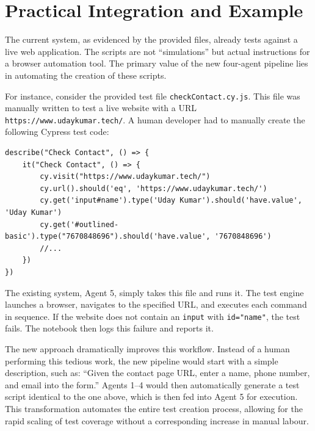 \documentclass{article}
\begin{document}
\section{Practical Integration and Example}
The current system, as evidenced by the provided files, already tests against a live web application. The scripts are not ``simulations'' but actual instructions for a browser automation tool. The primary value of the new four-agent pipeline lies in automating the creation of these scripts.

For instance, consider the provided test file \texttt{checkContact.cy.js}. This file was manually written to test a live website with a URL \texttt{https://www.udaykumar.tech/}. A human developer had to manually create the following Cypress test code:

\begin{verbatim}
describe("Check Contact", () => {
    it("Check Contact", () => {
        cy.visit("https://www.udaykumar.tech/")
        cy.url().should('eq', 'https://www.udaykumar.tech/')
        cy.get('input#name').type('Uday Kumar').should('have.value', 'Uday Kumar')
        cy.get('#outlined-basic').type("7670848696").should('have.value', '7670848696')
        //...
    })
})
\end{verbatim}

The existing system, Agent 5, simply takes this file and runs it. The test engine launches a browser, navigates to the specified URL, and executes each command in sequence. If the website does not contain an \texttt{input} with \texttt{id="name"}, the test fails. The notebook then logs this failure and reports it.

The new approach dramatically improves this workflow. Instead of a human performing this tedious work, the new pipeline would start with a simple description, such as: ``Given the contact page URL, enter a name, phone number, and email into the form.'' Agents 1--4 would then automatically generate a test script identical to the one above, which is then fed into Agent 5 for execution. This transformation automates the entire test creation process, allowing for the rapid scaling of test coverage without a corresponding increase in manual labour.
\end{document}
